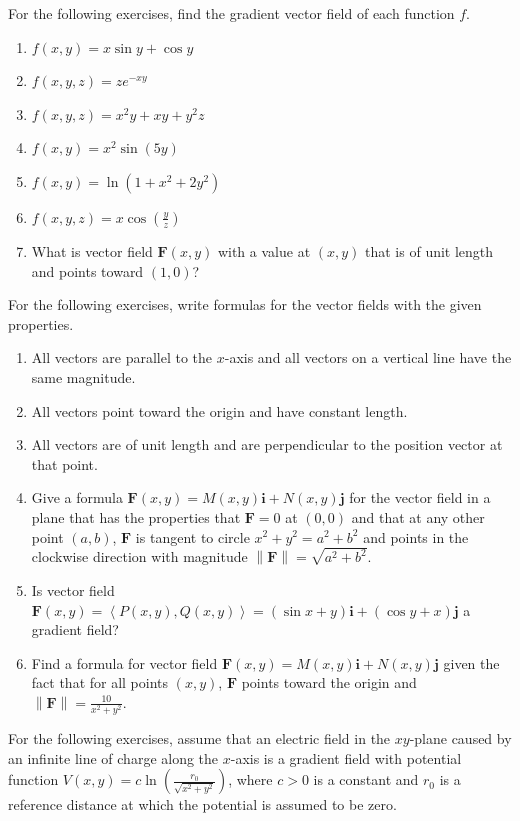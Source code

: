 \documentclass{exercises}
\begin{document}
For the following exercises, find the gradient vector field of each function $f$.

\begin{enumerate}[resume]
\item $f(x,y)=x\sin y+\cos y$
\item $f(x,y,z)=ze^{-xy}$
\item $f(x,y,z)=x^{2}y+xy+y^{2}z$
\item $f(x,y)=x^{2}\sin(5y)$
\item $f(x,y)=\ln(1+x^{2}+2y^{2})$
\item $f(x,y,z)=x\cos(\frac{y}{z})$
\item What is vector field $\mathbf{F}(x,y)$ with a value at $(x,y)$ that is of unit length and points toward $(1,0)$?
\end{enumerate}

For the following exercises, write formulas for the vector fields with the given properties.

\begin{enumerate}[resume]
\item All vectors are parallel to the $x$-axis and all vectors on a vertical line have the same magnitude.
\item All vectors point toward the origin and have constant length.
\item All vectors are of unit length and are perpendicular to the position vector at that point.
\item Give a formula $\mathbf{F}(x,y)=M(x,y)\mathbf{i}+N(x,y)\mathbf{j}$ for the vector field in a plane that has the properties that $\mathbf{F}=0$ at $(0,0)$ and that at any other point $(a,b)$, $\mathbf{F}$ is tangent to circle $x^{2}+y^{2}=a^{2}+b^{2}$ and points in the clockwise direction with magnitude $\left\| \mathbf{F} \right\|=\sqrt{a^{2}+b^{2}}$.
\item Is vector field $\mathbf{F}(x,y)=\left\langle P(x,y),Q(x,y) \right\rangle=(\sin x+y)\mathbf{i}+(\cos y+x)\mathbf{j}$ a gradient field?
\item Find a formula for vector field $\mathbf{F}(x,y)=M(x,y)\mathbf{i}+N(x,y)\mathbf{j}$ given the fact that for all points $(x,y)$, $\mathbf{F}$ points toward the origin and $\left\| \mathbf{F} \right\|=\frac{10}{x^{2}+y^{2}}$.
\end{enumerate}

For the following exercises, assume that an electric field in the $xy$-plane caused by an infinite line of charge along the $x$-axis is a gradient field with potential function $V(x,y)=c\ln(\frac{r_{0}}{\sqrt{x^{2}+y^{2}}})$, where $c>0$ is a constant and $r_{0}$ is a reference distance at which the potential is assumed to be zero.
\end{document}
